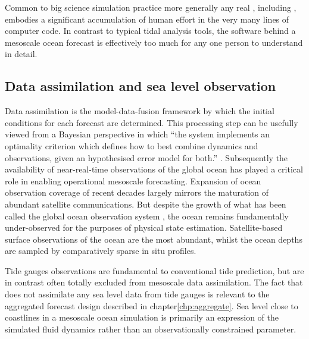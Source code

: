 Common to big science simulation practice more generally \citep{Petersen:2012tr} any real \OGCM{}, including \BL{}, embodies a significant accumulation of human effort in the very many lines of computer code.  In contrast to typical tidal analysis tools, the software behind a mesoscale ocean forecast is effectively too much for any one person to understand in detail.
\subsection{Data assimilation and sea level observation}
Data assimilation is the model-data-fusion framework by which the initial conditions for each \OGCM{} forecast are determined.
This processing step can be usefully viewed from a Bayesian perspective in which ``the system implements an optimality criterion which defines how to best combine dynamics and observations, given an hypothesised error model for both.'' \citep{10.1007/978-94-007-0332-2_13}.
Subsequently the availability of near-real-time observations of the global ocean has played a critical role in enabling operational mesoscale forecasting.  Expansion of ocean observation coverage of recent decades largely mirrors the maturation of abundant satellite communications.  But despite the growth of what has been called the global ocean observation system \GOOS{} \citep{Komen:1999ch}, the ocean remains fundamentally under-observed for the purposes of physical state estimation.   Satellite-based surface observations of the ocean are the most abundant, whilst the ocean depths are sampled by comparatively sparse in situ profiles.


Tide gauges observations are fundamental to conventional tide prediction, but are in contrast often totally excluded from mesoscale data assimilation.   The fact that \BL{} does not assimilate any sea level data from tide gauges is relevant to the aggregated forecast design described in chapter\ref{chp:aggregate}.      
Sea level close to coastlines in a mesoscale ocean simulation is primarily an expression of the simulated fluid dynamics rather than an observationally constrained parameter.

